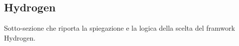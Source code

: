 \subsection{Hydrogen}

Sotto-sezione che riporta la spiegazione e la logica della scelta del framwork Hydrogen.